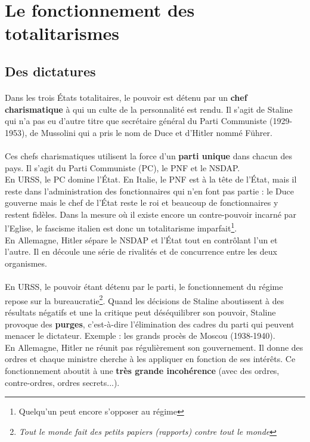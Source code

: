 \documentclass[12pt]{article}
\renewcommand{\emph}{\textbf}
\begin{document}
\section{Le fonctionnement des totalitarismes}

\subsection{Des dictatures}

\paragraph{}
Dans les trois États totalitaires, le pouvoir est détenu par un \emph{chef charismatique} à qui un culte de la personnalité est rendu. Il s'agit de Staline qui n'a pas eu d'autre titre que secrétaire général du Parti Communiste (1929-1953), de Mussolini qui a pris le nom de Duce et d'Hitler nommé Führer.

\paragraph{}
Ces chefs charismatiques utilisent la force d'un \emph{parti unique} dans chacun des pays. Il s'agit du Parti Communiste (PC), le PNF et le NSDAP.\\
En URSS, le PC domine l'État. En Italie, le PNF est à la tête de l'État, mais il reste dans l'administration des fonctionnaires qui n'en font pas partie : le Duce gouverne mais le chef de l'État reste le roi et beaucoup de fonctionnaires y restent fidèles. Dans la mesure où il existe encore un contre-pouvoir incarné par l'Eglise, le fascisme italien est donc un totalitarisme imparfait\footnote{Quelqu'un peut encore s'opposer au régime}.\\
En Allemagne, Hitler sépare le NSDAP et l'État tout en contrôlant l'un et l'autre. Il en découle une série de rivalités et de concurrence entre les deux organismes.

\paragraph{}
En URSS, le pouvoir étant détenu par le parti, le fonctionnement du régime repose sur la bureaucratie\footnote{\textit{Tout le monde fait des petits papiers (rapports) contre tout le monde}}. Quand les décisions de Staline aboutissent à des résultats négatifs et une la critique peut déséquilibrer son pouvoir, Staline provoque des \emph{purges}, c'est-à-dire l'élimination des cadres du parti qui peuvent menacer le dictateur. Exemple : les grands procès de Moscou (1938-1940).\\
En Allemagne, Hitler ne réunit pas régulièrement son gouvernement. Il donne des ordres et chaque ministre cherche à les appliquer en fonction de ses intérêts. Ce fonctionnement aboutit à une \emph{très grande incohérence} (avec des ordres, contre-ordres, ordres secrets...).
\end{document}
